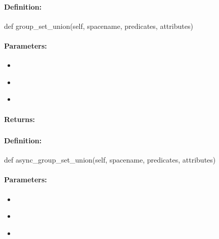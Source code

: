 \paragraph{Definition:}
\begin{pythoncode}
def group_set_union(self, spacename, predicates, attributes)
\end{pythoncode}

\paragraph{Parameters:}
\begin{itemize}[noitemsep]
\item {}\\

\item {}\\

\item {}\\

\end{itemize}

\paragraph{Returns:}


\pagebreak
\subsubsection{}
\label{api:python:async_group_set_union}


\paragraph{Definition:}
\begin{pythoncode}
def async_group_set_union(self, spacename, predicates, attributes)
\end{pythoncode}

\paragraph{Parameters:}
\begin{itemize}[noitemsep]
\item {}\\

\item {}\\

\item {}\\

\end{itemize}

